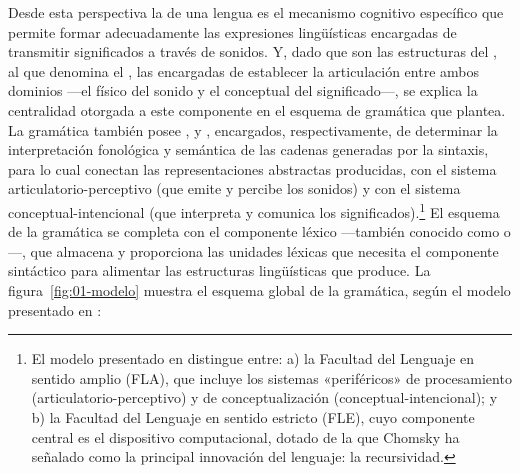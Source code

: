 Desde esta perspectiva la  de una lengua es el mecanismo
cognitivo específico que permite formar adecuadamente las expresiones
lingüísticas encargadas de transmitir significados a través de sonidos. Y, dado
que son las estructuras del , al que
\textcite{chomsky1999} denomina el , las
encargadas de establecer la articulación entre ambos dominios ---el físico del
sonido y el conceptual del significado---, se explica la centralidad otorgada a
este componente en el esquema de gramática que plantea. La gramática también
posee ,  y
, encargados, respectivamente, de determinar la
interpretación fonológica y semántica de las cadenas generadas por la sintaxis,
para lo cual conectan las representaciones abstractas producidas, con el
sistema articulatorio-perceptivo (que emite y percibe los sonidos) y con el
sistema conceptual-intencional (que interpreta y comunica los
significados).\footnote{El modelo presentado en \textcite{hauser2002}
distingue entre: a) la Facultad del Lenguaje en sentido amplio (FLA), que
incluye los sistemas «periféricos» de procesamiento (articulatorio-perceptivo)
y de conceptualización (conceptual-intencional); y b) la Facultad del Lenguaje
en sentido estricto (FLE), cuyo componente central es el dispositivo
computacional, dotado de la que Chomsky ha señalado como la principal
innovación del lenguaje: la recursividad.} El esquema de la gramática se
completa con el componente léxico ---también conocido como 
o ---, que almacena y proporciona las unidades léxicas
que necesita el componente sintáctico para alimentar las estructuras
lingüísticas que produce. La figura~\ref{fig:01-modelo} muestra el esquema
global de la gramática, según el modelo presentado en \textcite{chomsky1999}:

